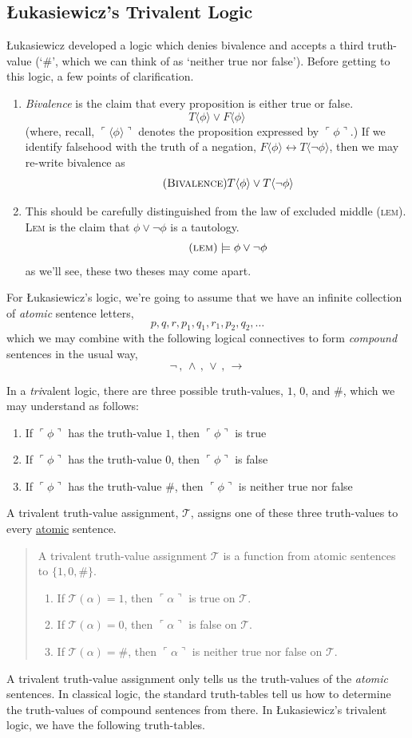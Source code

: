 \documentclass[landscape, two column, full page,reqno]{article}
\newcommand{\qd}{\begin{quote}\begin{description}  [align=left,style=nextline,leftmargin=*,labelsep=0pt,font=\normalfont]}
\newcommand{\zd}{\end{description}\end{quote}}
\newcommand{\qe}{\begin{enumerate}[align=left,style=nextline,leftmargin=17pt,labelsep=5pt,font=\normalfont]}
\newcommand{\e}{\emph}
\newcommand{\ze}{\end{enumerate}}
\newcommand{\p}{\item}
\newcommand{\qq}[1]{ \ulcorner #1 \urcorner}
\newcommand{\I}{\mathscr{T}}
\newcommand{\s}{\textsc}
\begin{document}
\subsection{ \L ukasiewicz's Trivalent Logic}			
\p \L ukasiewicz developed a logic which denies bivalence and accepts a third truth-value (`$\#$', which we can think of as `neither true nor false').   Before getting to this logic, a few points of clarification.
	\qe
	\p \e{Bivalence} is the claim that every proposition is either true or false.   
				\[
				T\langle \phi \rangle \vee F\langle \phi \rangle
				\]
(where, recall, $\qq{\langle \phi \rangle}$ denotes the proposition expressed by $\qq{\phi}$.) If we identify falsehood with the truth of a negation, $F\langle \phi \rangle \leftrightarrow T\langle \neg \phi \rangle$, then we may re-write bivalence as
				\[\tag{\s{Bivalence}}
				T\langle \phi \rangle \vee T\langle \neg \phi \rangle
				\]	
		\p This should be carefully distinguished from the law of excluded middle (\s{lem}).  \s{Lem} is the claim that $\phi \vee \neg \phi$ is a  tautology.
				\[\tag{\s{lem}}
				\models \phi \vee \neg \phi
				\]
		as we'll see, these two theses may come apart.
	\ze 
\p For \L ukasiewicz's logic, we're going to assume that we have an infinite collection of \e{atomic} sentence letters, 
	\[
	p, q, r, p_1, q_1, r_1, p_2, q_2, \dots
	\]				
which we may combine with the following logical connectives to form \e{compound} sentences in the usual way,
	\[
	\neg \,,\, \wedge \,,\, \vee \,,\, \to
	\]
\p In a \e{tri}valent logic, there are three possible truth-values, $1$, $0$, and $\#$, which we may understand as follows:
	\qe
	\p If $\qq{\phi}$ has the truth-value $1$, then $\qq{\phi}$ is true
	\p If $\qq{\phi}$ has the truth-value $0$, then $\qq{\phi}$ is false
	\p If $\qq{\phi}$ has the truth-value $\#$, then $\qq{\phi}$ is neither true nor false
	\ze 
\p A trivalent truth-value assignment, $\I$, assigns one of these three truth-values to every \underline{atomic} sentence.
		\qd
		\p[\s{Trivalent Truth-Value Assignment}] A trivalent truth-value assignment $\mathscr{T}$ is a function from atomic sentences to $\{ 1, 0, \# \}$.
				\qe
				\p If $\I(\alpha) = 1$, then $\qq{\alpha}$ is true on $\I$.
				\p If $\I(\alpha) = 0$, then $\qq{\alpha}$ is false on  $\I$.
				\p If $\I(\alpha) = \#$, then $\qq{\alpha}$ is neither true nor false on $\I$.
				\ze 
		\zd 
\p A trivalent truth-value assignment only tells us the truth-values of the \e{atomic} sentences.  In classical logic, the standard truth-tables tell us how to determine the truth-values of compound sentences from there.   In \L ukasiewicz's trivalent logic, we have the following truth-tables.
\end{document}
